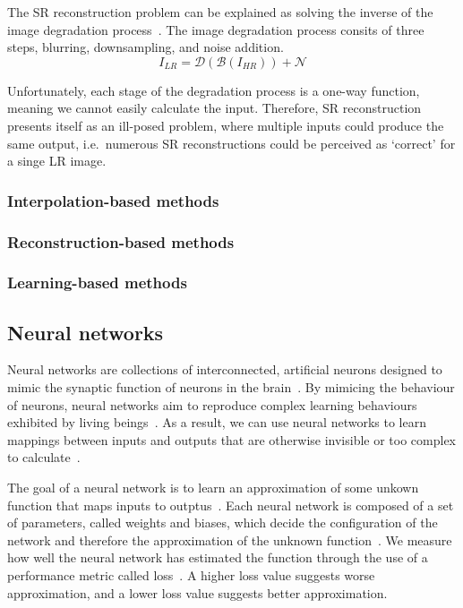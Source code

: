 The SR reconstruction problem can be explained as solving the inverse of the image degradation process~\cite{imageDeg}. The image degradation process consits of three steps, blurring, downsampling, and noise addition.
\[I_{LR} = \mathcal{D}(\mathcal{B}(I_{HR})) + \mathcal{N}\]

Unfortunately, each stage of the degradation process is a one-way function, meaning we cannot easily calculate the input. Therefore, SR reconstruction presents itself as an ill-posed problem, where multiple inputs could produce the same output, i.e.\ numerous SR reconstructions could be perceived as `correct' for a singe LR image.

\subsubsection{Interpolation-based methods}

\subsubsection{Reconstruction-based methods}

\subsubsection{Learning-based methods}

\subsection{Neural networks}\label{subsec:neural_networks}
Neural networks are collections of interconnected, artificial neurons designed to mimic the synaptic function of neurons in the brain~\cite{ref}. By mimicing the behaviour of neurons, neural networks aim to reproduce complex learning behaviours exhibited by living beings~\cite{ref}. As a result, we can use neural networks to learn mappings between inputs and outputs that are otherwise invisible or too complex to calculate~\cite{ref}.

The goal of a neural network is to learn an approximation of some unkown function that maps inputs to outptus~\cite{ref}. Each neural network is composed of a set of parameters, called weights and biases, which decide the configuration of the network and therefore the approximation of the unknown function~\cite{ref}. We measure how well the neural network has estimated the function through the use of a performance metric called loss~\cite{ref}. A higher loss value suggests worse approximation, and a lower loss value suggests better approximation.

